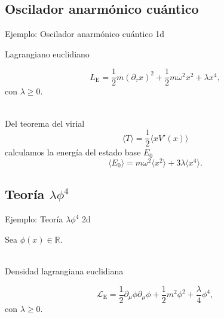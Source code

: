 \documentclass[11pt]{beamer}
\begin{document}
\begin{frame}
\end{frame}

\subsection{Oscilador anarmónico cuántico}
\begin{frame}{Ejemplo: Oscilador anarmónico cuántico 1d}

    Lagrangiano euclidiano

    $$ L_{\text{E}} = \frac{1}{2}m\left(\partial_{\tau}x\right)^2 + \frac{1}{2}m\omega^2 x^2 + \lambda x^4,$$
con $\lambda \ge 0$. \\~

Del teorema del virial 
$$\langle T \rangle = \frac{1}{2}\langle x V'(x) \rangle$$
calculamos la energía del estado base $E_0$ 
$$ \langle E_0 \rangle = m\omega^2\langle x^2 \rangle + 3\lambda \langle x^4 \rangle. $$
\end{frame}


\subsection{Teoría $\lambda \phi^4$}
\begin{frame}{Ejemplo: Teoría $\lambda \phi^4$ 2d}

Sea $\phi(x)\in\mathbb{R}$.\\~

Densidad lagrangiana euclidiana

    $$ \mathcal{L}_{\text{E}} = \frac{1}{2}\partial_{\mu} \phi \partial_{\mu}\phi + \frac{1}{2}m^2  \phi^2 + \frac{\lambda}{4} \phi^4,$$
    con $\lambda \ge 0$. \\~
\end{frame}

\begin{frame}
\end{frame}
\end{document}
